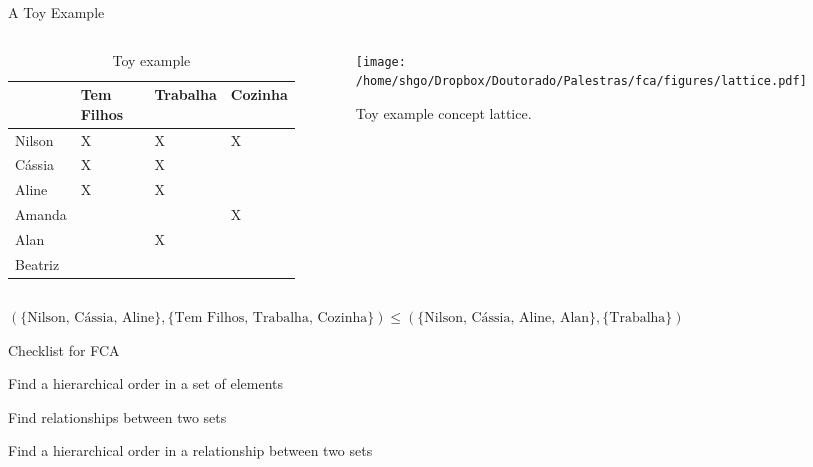 \documentclass[pdf,xcolor=table]{beamer}
\newcommand{\cmark}{\ding{51}}%
\newcommand{\done}{\rlap{$\square$}{\raisebox{2pt}{\large\hspace{1pt}\cmark}}%
\hspace{-2.5pt}}
\begin{document}
\begin{frame}[t]{A Toy Example}
    \begin{columns}
        \begin{column}{0.5\textwidth}
            \begin{table}[]
            \tiny
            \centering
            \caption{Toy example}
            \begin{tabular}{@{}|l|l|l|l|@{}}
            \hline
                    & Tem Filhos & Trabalha & Cozinha \\\hline
            Nilson  & X          & X        & X       \\\hline
            Cássia  & X          & X        &         \\\hline
            Aline   & X          & X        &         \\\hline
            Amanda  &            &          & X       \\\hline
            Alan    &            & X        &         \\\hline
            Beatriz &            &          &         \\\hline
            \end{tabular}
            \end{table}
        \end{column}
        \begin{column}{0.5\textwidth}
            \begin{figure}[h]
                \texttt{[image: /home/shgo/Dropbox/Doutorado/Palestras/fca/figures/lattice.pdf]}
                \caption{Toy example concept lattice.}
            \end{figure}
        \end{column}
    \end{columns}
    $(\{\text{Nilson, Cássia, Aline}\}, \{\text{Tem Filhos, Trabalha, Cozinha}\}) \leq (\{\text{Nilson, Cássia, Aline, Alan}\}, \{\text{Trabalha}\})$
\end{frame}




\begin{frame}[t]{Checklist for FCA}
    \begin{todolist}
        \item[\done] Find a hierarchical order in a set of elements
        \item[\done] Find relationships between two sets
        \item[\done] Find a hierarchical order in a relationship between two sets
    \end{todolist}
\end{frame}
\end{document}
